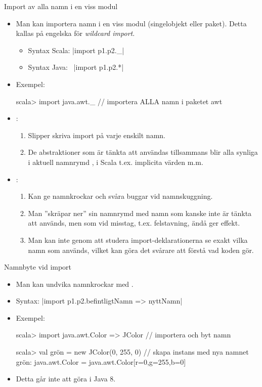 \begin{Slide}{Import av alla namn i en viss modul}\SlideFontSmall
\begin{itemize}
\item Man kan importera  namn i en viss modul (singelobjekt eller paket). Detta kallas på engelska för \emph{wildcard import}.

\begin{itemize}\SlideFontTiny
  \item Syntax Scala:  \code|import p1.p2._|
  \item Syntax Java:~  \code|import p1.p2.*|
\end{itemize}

\item Exempel:
\begin{REPL}
scala> import java.awt._  // importera ALLA namn i paketet awt
\end{REPL}
\item {}:
\begin{enumerate}\SlideFontTiny
  \item Slipper skriva import på varje enskilt namn.
  \item De abstraktioner som är tänkta att användas tillsammans blir alla synliga i aktuell namnrymd , i Scala t.ex. implicita värden m.m.
\end{enumerate}
\item {}:
\begin{enumerate}\SlideFontTiny
  \item Kan ge namnkrockar och svåra buggar vid namnskuggning.
  \item Man ''skräpar ner'' sin namnrymd med namn som kanske inte är tänkta att används, men som vid misstag, t.ex. felstavning, ändå ger effekt.
  \item Man kan inte genom att studera import-deklarationerna se exakt vilka namn som används, vilket kan göra det svårare att förstå vad koden gör.
\end{enumerate}
\end{itemize}
\end{Slide}


\begin{Slide}{Namnbyte vid import}
\begin{itemize}
\item Man kan undvika namnkrockar med .
\item Syntax:  \code|import p1.p2.{befintligtNamn => nyttNamn}|
\item Exempel:
\begin{REPL}
scala> import java.awt.{Color => JColor}  // importera och byt namn

scala> val grön = new JColor(0, 255, 0)   // skapa instans med nya namnet
grön: java.awt.Color = java.awt.Color[r=0,g=255,b=0]
\end{REPL}
\item Detta går inte att göra i Java 8.
\end{itemize}
\end{Slide}


